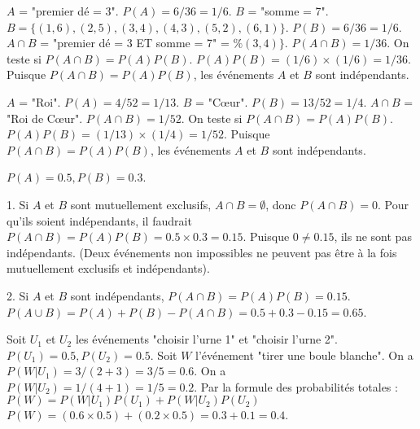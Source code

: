 
\begin{correctionbox}
$A$ = "premier dé = 3". $P(A) = 6/36 = 1/6$.
$B$ = "somme = 7". $B = \{(1,6), (2,5), (3,4), (4,3), (5,2), (6,1)\}$. $P(B) = 6/36 = 1/6$.
$A \cap B$ = "premier dé = 3 ET somme = 7" = $\%(3,4)\}$. $P(A \cap B) = 1/36$.
On teste si $P(A \cap B) = P(A)P(B)$.
$P(A)P(B) = (1/6) \times (1/6) = 1/36$.
Puisque $P(A \cap B) = P(A)P(B)$, les événements $A$ et $B$ sont indépendants.
\end{correctionbox}

\begin{correctionbox}
$A$ = "Roi". $P(A) = 4/52 = 1/13$.
$B$ = "Cœur". $P(B) = 13/52 = 1/4$.
$A \cap B$ = "Roi de Cœur". $P(A \cap B) = 1/52$.
On teste si $P(A \cap B) = P(A)P(B)$.
$P(A)P(B) = (1/13) \times (1/4) = 1/52$.
Puisque $P(A \cap B) = P(A)P(B)$, les événements $A$ et $B$ sont indépendants.
\end{correctionbox}

\begin{correctionbox}
$P(A)=0.5, P(B)=0.3$.

1.  Si $A$ et $B$ sont mutuellement exclusifs, $A \cap B = \emptyset$, donc $P(A \cap B) = 0$.
    Pour qu'ils soient indépendants, il faudrait $P(A \cap B) = P(A)P(B) = 0.5 \times 0.3 = 0.15$.
    Puisque $0 \neq 0.15$, ils ne sont pas indépendants. (Deux événements non impossibles ne peuvent pas être à la fois mutuellement exclusifs et indépendants).

2.  Si $A$ et $B$ sont indépendants, $P(A \cap B) = P(A)P(B) = 0.15$.
    $P(A \cup B) = P(A) + P(B) - P(A \cap B) = 0.5 + 0.3 - 0.15 = 0.65$.
\end{correctionbox}


\begin{correctionbox}
Soit $U_1$ et $U_2$ les événements "choisir l'urne 1" et "choisir l'urne 2". $P(U_1)=0.5, P(U_2)=0.5$.
Soit $W$ l'événement "tirer une boule blanche".
On a $P(W|U_1) = 3 / (2+3) = 3/5 = 0.6$.
On a $P(W|U_2) = 1 / (4+1) = 1/5 = 0.2$.
Par la formule des probabilités totales :
$P(W) = P(W|U_1)P(U_1) + P(W|U_2)P(U_2)$
$P(W) = (0.6 \times 0.5) + (0.2 \times 0.5) = 0.3 + 0.1 = 0.4$.
\end{correctionbox}

